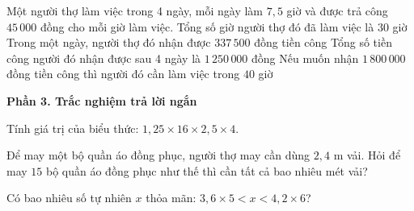 \begin{ex} %
Một người thợ làm việc trong 4 ngày, mỗi ngày làm $7{,}5$ giờ và được trả công $45\,000$ đồng cho mỗi giờ làm việc.
\choiceTF
{\True Tổng số giờ người thợ đó đã làm việc là $30$ giờ}
{\True Trong một ngày, người thợ đó nhận được $337\,500$ đồng tiền công}
{Tổng số tiền công người đó nhận được sau 4 ngày là $1\,250\,000$ đồng}
{\True Nếu muốn nhận $1\,800\,000$ đồng tiền công thì người đó cần làm việc trong $40$ giờ}
\end{ex}

\textbf{Phần 3. Trắc nghiệm trả lời ngắn}

\begin{ex} %
Tính giá trị của biểu thức: $1{,}25 \times 16 \times 2{,}5 \times 4$.
\end{ex}

\begin{ex} %
Để may một bộ quần áo đồng phục, người thợ may cần dùng $2{,}4\text{ m}$ vải. Hỏi để may $15$ bộ quần áo đồng phục như thế thì cần tất cả bao nhiêu mét vải?
\end{ex}

\begin{ex} %
Có bao nhiêu số tự nhiên $x$ thỏa mãn: $3{,}6 \times 5 < x < 4{,}2 \times 6$?
\end{ex}

